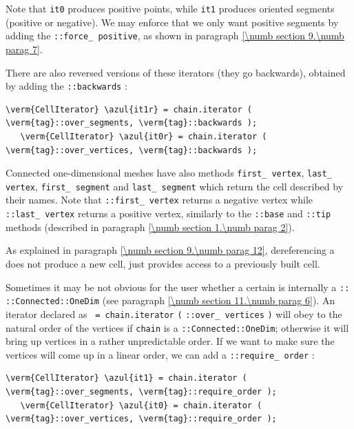 Note that {\small\tt it0} produces positive points, while {\small\tt  it1} produces
oriented segments (positive or negative).
We may enforce that we only want positive segments by adding the
{\small\tt {}::force\_\,positive}, as shown in paragraph \ref{\numb section 9.\numb parag 7}.

There are also reversed versions of these iterators (they go backwards), obtained by adding
the {\small\tt {}::backwards} :

\begin{Verbatim}[commandchars=\\\{\},formatcom=\small\tt,
   baselinestretch=0.94,framesep=2mm                      ]
   \verm{CellIterator} \azul{it1r} = chain.iterator ( \verm{tag}::over_segments, \verm{tag}::backwards );
   \verm{CellIterator} \azul{it0r} = chain.iterator ( \verm{tag}::over_vertices, \verm{tag}::backwards );
\end{Verbatim}

Connected one-dimensional meshes have also methods {\small\tt first\_\,vertex},
{\small\tt last\_\,vertex},\break
{\small\tt first\_\,segment} and {\small\tt last\_\,segment} which return the cell described by their
names.
Note that {\small\tt {}::first\_\,vertex} returns a negative vertex while
{\small\tt {}::last\_\,vertex} returns a positive vertex, similarly to the
{\small\tt {}::base} and {\small\tt {}::tip} methods (described in paragraph
\ref{\numb section 1.\numb parag 2}).

As explained in paragraph \ref{\numb section 9.\numb parag 12},
dereferencing a {\small\tt {}} does not produce a new cell,
just provides access to a previously built cell.

Sometimes it may be not obvious for the user whether a certain {\small\tt {}}
is internally a {\small\tt {}:: ::Connected::OneDim}
(see paragraph \ref{\numb section 11.\numb parag 6}).
An iterator declared as {\small\tt {} = chain.iterator}\break
{\small\tt(} {\small\tt{}::over\_\,vertices} {\small\tt)} will obey to
the natural order of the vertices if {\small\tt chain} is a\break
{\small\tt {}::Connected::OneDim}; otherwise it will bring up vertices
in a rather unpredictable order.
If we want to make sure the vertices will come up in a linear order, we can add a
{\small\tt {}::require\_\,order} :

\begin{Verbatim}[commandchars=\\\{\},formatcom=\small\tt,
   baselinestretch=0.94,framesep=2mm                      ]
   \verm{CellIterator} \azul{it1} = chain.iterator ( \verm{tag}::over_segments, \verm{tag}::require_order );
   \verm{CellIterator} \azul{it0} = chain.iterator ( \verm{tag}::over_vertices, \verm{tag}::require_order );
\end{Verbatim}

